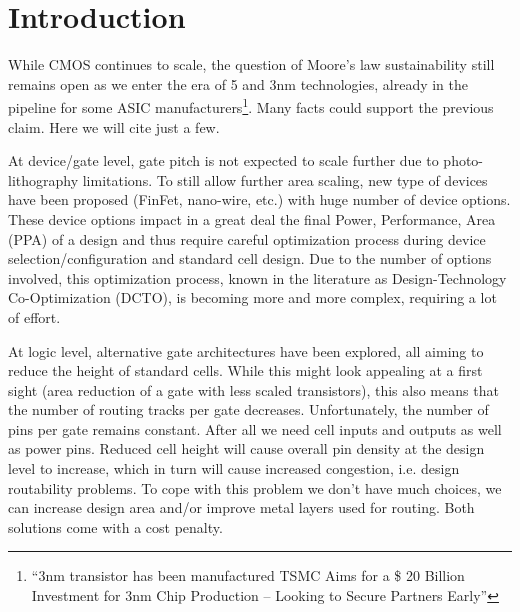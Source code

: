 \documentclass[conference]{IEEEtran}
\begin{document}

\section{Introduction}
While CMOS continues to scale, the question of Moore's law sustainability still remains open as we enter the era of 5 and 3nm technologies, already in the pipeline for some ASIC manufacturers\footnote{``3nm transistor has been manufactured TSMC Aims for a \$ 20 Billion Investment for 3nm Chip Production – Looking to Secure Partners Early''}. Many facts could support the previous claim. Here we will cite just a few. 

At device/gate level, gate pitch is not expected to scale further due to photo-lithography limitations. To still allow further area scaling, new type of devices have been proposed (FinFet, nano-wire, etc.) with huge number of device options. These device options impact in a great deal the final Power, Performance, Area (PPA) of a design and thus require careful optimization process during device selection/configuration and standard cell design. Due to the number of options involved, this optimization process, known in the literature as Design-Technology Co-Optimization (DCTO), is becoming more and more complex, requiring a lot of effort.

At logic level, alternative gate architectures have been explored, all aiming to reduce the height of standard cells. While this might look appealing at a first sight (area reduction of a gate with less scaled transistors), this also means that the number of routing tracks per gate decreases. Unfortunately, the number of pins per gate remains constant. After all we need cell inputs and outputs as well as power pins. Reduced cell height will cause overall pin density at the design level to increase, which in turn will cause increased congestion, i.e. design routability problems. To cope with this problem we don't have much choices, we can increase design area and/or improve metal layers used for routing. Both solutions come with a cost penalty. 
\end{document}
